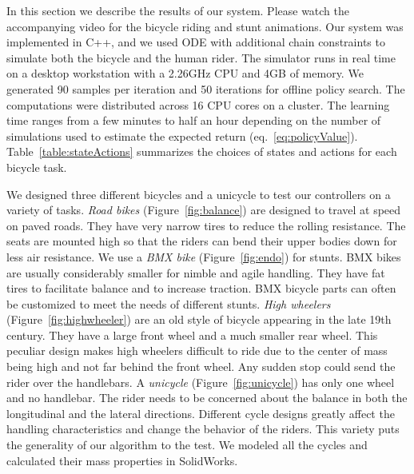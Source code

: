 In this section we describe the results of our system. Please watch the accompanying video for the bicycle riding and stunt
animations. Our system was implemented in C++, and we used ODE with additional chain constraints to simulate both the bicycle and the human rider. The simulator runs in real time on a desktop workstation with a 2.26GHz CPU and 4GB of memory. We generated 90 samples per iteration and 50 iterations for offline policy search. The computations were distributed across 16 CPU cores on a cluster. The learning time ranges from a few minutes to half an hour depending on the number of simulations used to estimate the expected return (eq.~\ref{eq:policyValue}). Table~\ref{table:stateActions} summarizes the choices of states and actions for each bicycle task.

We designed three different bicycles and a unicycle to test our controllers on a variety of tasks. \emph{Road bikes} (Figure~\ref{fig:balance}) are designed to travel at speed on paved roads. They have very narrow tires to reduce the rolling resistance. The seats are mounted high so that the riders can bend their upper bodies down for less air resistance. We use a \emph{BMX bike} (Figure~\ref{fig:endo}) for stunts. BMX bikes are usually considerably smaller for nimble and agile handling. They have fat tires to facilitate balance and to increase traction. BMX bicycle parts can often be customized to meet the needs of different stunts. \emph{High wheelers} (Figure~\ref{fig:highwheeler}) are an old style of bicycle appearing in the late 19th century. They have a large front wheel and a much smaller rear wheel. This peculiar design makes high wheelers difficult to ride due to the center of mass being high and not far behind the front wheel. Any sudden stop could send the rider over the handlebars. A \emph{unicycle} (Figure~\ref{fig:unicycle}) has only one wheel and no handlebar. The rider needs to be concerned about the balance in both the longitudinal and the lateral directions. Different cycle designs greatly affect the handling characteristics and change the behavior of the riders. This variety puts the generality of our algorithm to the test. We modeled all the cycles and calculated their mass properties in SolidWorks.

